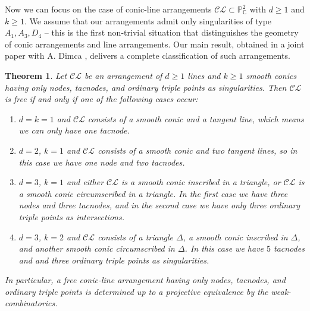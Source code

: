 \documentclass[12pt]{article}
\theoremstyle{plain}
\newtheorem{theorem}[thm]{Theorem}
\theoremstyle{definition}
\renewcommand\geq{\geqslant}
\begin{document}
Now we can focus on the case of conic-line arrangements $\mathcal{CL} \subset \mathbb{P}^{2}_{\mathbb{C}}$ with $d\geq 1$ and $k\geq 1$. We assume that our arrangements admit only singularities of type $A_{1}, A_{3}, D_{4}$ -- this is the first non-trivial situation that distinguishes the geometry of conic arrangements and line arrangements.
Our main result, obtained in a joint paper with A. Dimca \cite{DimcaPokora}, delivers a complete classification of such arrangements.

\begin{theorem}
\label{thm11}
Let $\mathcal{CL}$ be an arrangement of $d \geq 1$ lines and $k \geq 1$ smooth conics having only nodes, tacnodes, and  ordinary triple points as singularities. Then  $\mathcal{CL}$ is free if and only if one of the following cases occur:
\begin{enumerate}

\item[(1)] $d=k=1$ and $\mathcal{CL}$ consists of a smooth conic and a tangent line, which means we can only have one tacnode.

\item[(2)] $d=2$, $k=1$ and $\mathcal{CL}$ consists of a smooth conic and two tangent lines, so in this case we have one node and two tacnodes.

\item[(3)] $d=3$, $k=1$ and either $\mathcal{CL}$ is a smooth conic inscribed in a triangle, or $\mathcal{CL}$ is a smooth conic circumscribed in a triangle.
In the first case we have three nodes and three tacnodes, and in the second case we have only three ordinary triple points as intersections.

\item[(4)] $d=3$, $k=2$ and $\mathcal{CL}$ consists of a triangle $\Delta$, a smooth conic inscribed in $\Delta$, and another smooth conic circumscribed in $\Delta$. In this case we have $5$ tacnodes and and three ordinary triple points as singularities.

\end{enumerate}
In particular, a free conic-line arrangement having only nodes, tacnodes, and ordinary triple points is determined up to a projective equivalence by the weak-combinatorics.
\end{theorem}
\end{document}
